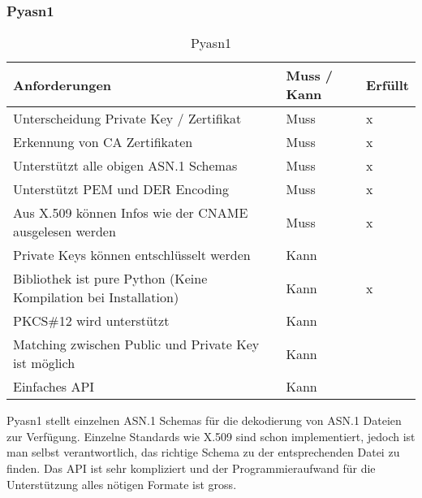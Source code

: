 \subsubsection{Pyasn1}
\begin{table}[H]
\centering
    \begin{tabular}{|p{12cm}|l|l|}
    \hline
    \rowcolor{lightblue}
    Anforderungen & Muss / Kann & Erfüllt   \\ \hline
	Unterscheidung Private Key / Zertifikat	&	Muss & x \\ \hline	
	Erkennung von CA Zertifikaten	&	Muss	& x \\ \hline	
	Unterstützt alle obigen ASN.1 Schemas	&	Muss	& x \\ \hline		
	Unterstützt PEM und DER Encoding	&	Muss	& x \\ \hline	
	Aus X.509 können Infos wie der CNAME ausgelesen werden &	Muss	& x \\ \hline	
	Private Keys können entschlüsselt werden &	Kann &  \\ \hline
	Bibliothek ist pure Python (Keine Kompilation bei Installation) &	Kann	&  x \\ \hline
	PKCS\#12 wird unterstützt &	Kann &  \\ \hline
	Matching zwischen Public und Private Key ist möglich &	Kann &  \\ \hline
	Einfaches API &	Kann &  \\ \hline
	\end{tabular}
    \caption[Pyasn1]{Pyasn1}
\end{table}

Pyasn1 stellt einzelnen ASN.1 Schemas für die dekodierung von ASN.1 Dateien zur Verfügung. Einzelne Standards wie X.509 sind schon implementiert, jedoch ist man selbst verantwortlich, das richtige Schema zu der entsprechenden Datei zu finden. Das API ist sehr kompliziert und der Programmieraufwand für die Unterstützung alles nötigen Formate ist gross.


